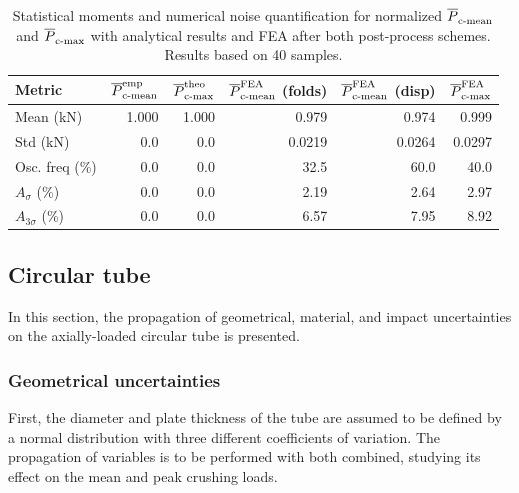 \documentclass[12pt,number,preprint,review,times]{elsarticle}
\begin{document}
\begin{table}[!htpb]
\begin{center}
\begin{tabular}[t]{lrrrrr} \toprule
Metric & $\overline{P}^{\mathrm{emp}}_{\mathrm{c{\text -}mean}}$     & $\overline{P}^{\mathrm{theo}}_{\mathrm{c{\text -}max}}$   &    $\overline{P}^{\mathrm{FEA}}_{\mathrm{c{\text -}mean}}$ (folds)   & $\overline{P}^{\mathrm{FEA}}_{\mathrm{c{\text -}mean}}$ (disp)   &    $\overline{P}^{\mathrm{FEA}}_{\mathrm{c{\text -}max}}$   \\\midrule
Mean (kN)  &  1.000 & 1.000 & 0.979  & 0.974 & 0.999  \\
Std (kN) &  0.0 & 0.0 & 0.0219 &  0.0264 & 0.0297   \\\midrule
Osc. freq (\%) &  0.0 & 0.0 &  32.5 & 60.0 & 40.0  \\
$A_{\sigma}$ (\%) & 0.0 & 0.0 &  2.19 & 2.64 & 2.97   \\
$A_{3 \sigma}$ (\%) & 0.0 & 0.0 &  6.57 & 7.95 & 8.92   \\
\bottomrule
\end{tabular}
\captionsetup{justification=centering}
\caption{Statistical moments and numerical noise quantification \citep{gilkeson_dealing_2014} for normalized $\overline{P}^{\mathrm{}}_{\mathrm{c{\text -}mean}}$ and $\overline{P}^{\mathrm{}}_{\mathrm{c{\text -}max}}$ with analytical results and FEA after both post-process schemes. Results based on 40 samples.}
\label{tab:num_noise}
\end{center}
\end{table}

\subsection{Circular tube}

In this section, the propagation of geometrical, material, and impact uncertainties on the axially-loaded circular tube is presented. %

\subsubsection{Geometrical uncertainties}  

First, the diameter and plate thickness of the tube are assumed to be defined by a normal distribution with three different coefficients of variation. The propagation of variables is to be performed with both combined, studying its effect on the mean and peak crushing loads.
\end{document}
